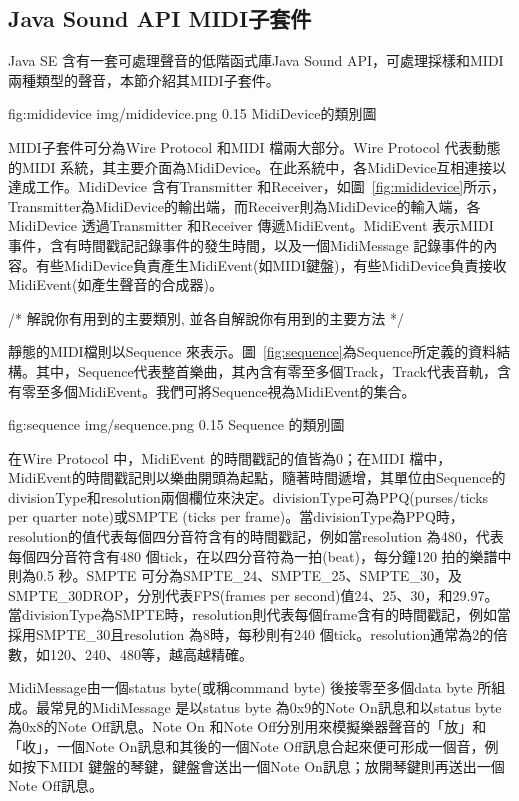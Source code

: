 \documentclass[12pt,a4paper,oneside]{report}
\begin{document}
\subsection{Java Sound API MIDI子套件}

Java SE 含有一套可處理聲音的低階函式庫Java Sound API，可處理採樣和MIDI兩種類型的聲音，本節介紹其MIDI子套件。

\figurewithcaption
{fig:mididevice}
{img/mididevice.png}
{0.15}
{MidiDevice的類別圖}

MIDI子套件可分為Wire Protocol 和MIDI 檔兩大部分。Wire Protocol 代表動態的MIDI 系統，其主要介面為MidiDevice。在此系統中，各MidiDevice互相連接以達成工作。MidiDevice 含有Transmitter 和Receiver，如圖~\ref{fig:mididevice}所示，Transmitter為MidiDevice的輸出端，而Receiver則為MidiDevice的輸入端，各MidiDevice 透過Transmitter 和Receiver 傳遞MidiEvent。MidiEvent 表示MIDI 事件，含有時間戳記記錄事件的發生時間，以及一個MidiMessage 記錄事件的內容。有些MidiDevice負責產生MidiEvent(如MIDI鍵盤)，有些MidiDevice負責接收MidiEvent(如產生聲音的合成器)。

/*
     解說你有用到的主要類別, 並各自解說你有用到的主要方法
*/




靜態的MIDI檔則以Sequence 來表示。圖~\ref{fig:sequence}為Sequence所定義的資料結構。其中，Sequence代表整首樂曲，其內含有零至多個Track，Track代表音軌，含有零至多個MidiEvent。我們可將Sequence視為MidiEvent的集合。

\figurewithcaption
{fig:sequence}
{img/sequence.png}
{0.15}
{Sequence 的類別圖}

在Wire Protocol 中，MidiEvent 的時間戳記的值皆為0；在MIDI 檔中，MidiEvent的時間戳記則以樂曲開頭為起點，隨著時間遞增，其單位由Sequence的divisionType和resolution兩個欄位來決定。divisionType可為PPQ(purses/ticks per quarter note)或SMPTE (ticks per frame)。當divisionType為PPQ時，resolution的值代表每個四分音符含有的時間戳記，例如當resolution 為480，代表每個四分音符含有480 個tick，在以四分音符為一拍(beat)，每分鐘120 拍的樂譜中則為0.5 秒。SMPTE 可分為SMPTE_24、SMPTE_25、SMPTE_30，及SMPTE_30DROP，分別代表FPS(frames per second)值24、25、30，和29.97。當divisionType為SMPTE時，resolution則代表每個frame含有的時間戳記，例如當採用SMPTE_30且resolution 為8時，每秒則有240 個tick。resolution通常為2的倍數，如120、240、480等，越高越精確。

MidiMessage由一個status byte(或稱command byte) 後接零至多個data byte 所組成。最常見的MidiMessage 是以status byte 為0x9的Note On訊息和以status byte 為0x8的Note Off訊息。Note On 和Note Off分別用來模擬樂器聲音的「放」和「收」，一個Note On訊息和其後的一個Note Off訊息合起來便可形成一個音，例如按下MIDI 鍵盤的琴鍵，鍵盤會送出一個Note On訊息；放開琴鍵則再送出一個Note Off訊息。
\end{document}
